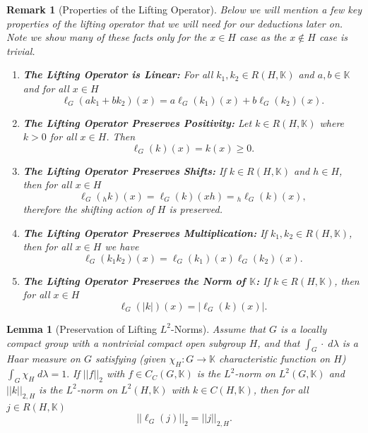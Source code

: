 \documentclass[10pt,a4paper]{amsart}
\newtheorem{remark}{Remark}
\newtheorem{lemma}{Lemma}
\newcommand{\K}{\mathbb{K}}
\newcommand{\cck}{C_C (G,\mathbb{K})}
\newcommand{\lck}{L^2 (G,\mathbb{K})}
\begin{document}
\begin{remark}[Properties of the Lifting Operator]\label{liftingopproperties} Below we will mention a few key properties of the lifting operator that we will need for our deductions later on. Note we show many of these facts only for the $x\in H$ case as the $x\notin H$ case is trivial.
 \begin{enumerate}
 \item\textbf{The Lifting Operator is Linear:}
For all $k_1,k_2\in R(H,\K)$ and $a,b\in\K$ and for all $x\in H$
\[  \ell_G(ak_1+bk_2)(x)=a\ell_G(k_1)(x)+b\ell_G(k_2)(x). \]
 \item\textbf{The Lifting Operator Preserves Positivity:}
 Let $k\in R(H,\K)$ where $k  >0$ for all $x \in H$.  Then
\[ \ell_G(k)(x)=  k(x) \ge 0. \]
 \item\textbf{The Lifting Operator Preserves Shifts:}
 If $k \in R(H,\K)$ and $h\in H$, then for all $x\in H$
\[ \ell_G({}_h k)(x)= \ell_G(k)(xh)=  {}_h \ell_G(k)(x),\]
 therefore the shifting action of $H$ is preserved. %
 \item\textbf{The Lifting Operator Preserves Multiplication:}
 If $k_1,k_2\in R(H,\K)$, then for all $x\in H$ we have
\[ \ell_G(k_1k_2)(x)=\ell_G(k_1)(x)\ell_G(k_2)(x). \] %
 \item\textbf{The Lifting Operator Preserves the Norm of $\K$:}
 If $k\in R(H,\K)$, then for all $x\in H$
\[ \ell_G(|k|)(x) =|\ell_G(k)(x)|.\]
 \end{enumerate}
\end{remark}

\begin{lemma}[Preservation of Lifting $L^2$-Norms]\label{liftinglemma} Assume that $G$ is a locally compact group with  a nontrivial  compact open  subgroup $H$, and that $\int_G\cdot \;d\lambda$ is a Haar measure on $G$ satisfying (given $\chi_H:G\rightarrow\K$ characteristic function on $H$) $\int_G \chi_H  \; d\lambda=1.$ 
If  $||f||_2$ with $f\in\cck$ is the $L^2$-norm on $\lck$ and  $||k||_{2,H}$ is the $L^2$-norm on $L^2(H,\K)$ with $k\in C(H,\K)$, then  for all $j\in R(H,\K)$ 
 \[
 ||\ell_G(j)||_2=||j||_{2,H}.
 \]
\end{lemma}
\end{document}
